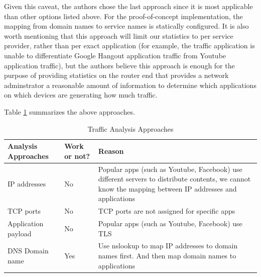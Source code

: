 \begin{itemize}
	Given this caveat, the authors chose the last approach since it is most applicable than other options listed above. For the proof-of-concept implementation, the mapping from domain names to service names is statically configured. It is also worth mentioning that this approach will limit our statistics to per service provider, rather than per exact application (for example, the traffic application is unable to differentiate Google Hangout application traffic from Youtube application traffic), but the authors believe this approach is enough for the purpose of providing statistics on the router end that provides a network adminstrator a reasonable amount of information to determine which applications on which devices are generating how much traffic.

\end{itemize} 
	
Table \ref{appfilterchoice} summarizes the above approaches.

\begin{table}
	\centering
	\caption{Traffic Analysis Approaches}
	\label{appfilterchoice}
	\begin{tabular}{p{4cm}|p{2cm}|p{10cm}} \hline
		Analysis Approaches & Work or not? & Reason \\ \hline
		IP addresses & No & Popular apps (such as Youtube, Facebook) use different servers to distribute contents, we cannot know the mapping between IP addresses and applications \\ \hline
		TCP ports & No & TCP ports are not assigned for specific apps\\ \hline
		Application payload & No  & Popular apps (such as Youtube, Facebook) use TLS\\ \hline
		DNS Domain name & Yes & Use nslookup to map IP addresses to domain names first. And then map domain names to applications \\
		\hline\end{tabular}
\end{table}